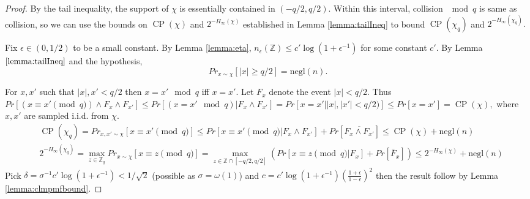 \documentclass[11pt]{article}
\newcommand{\negl}[1]{\text{negl}(#1)}
\newcommand{\Z}{\mathbb{Z}}
\newcommand{\abs}[1]{|#1 |}
\newtheorem{lemma}{Lemma}[section]
\DeclareMathOperator{\cp}{CP}
\begin{document}
\begin{proof}
By the tail inequality, the support of $\chi$ is essentially contained in $(-q/2, q/2).$ Within this interval, collision $\mod q$ is same as collision, so we can use the bounds on $\cp(\chi)$ and $2^{-H_{\infty}(\chi)} $ established in Lemma \ref{lemma:tailIneq} to bound $\cp(\chi_q)$ and $ 2^{-H_{\infty}(\chi_q)}.$

Fix $\epsilon\in (0,1/2)$ to be a small constant. By Lemma \ref{lemma:eta}, $n_{\epsilon}(\Z) \leq c' \log (1+ \epsilon^{-1})$ for some constant $c'.$ By Lemma $\ref{lemma:tailIneq}$ and the hypothesis, $$Pr_{x \sim \chi} [ \abs{x} \geq q/2] = \negl{n}.$$

For $x,x'$ such that $\abs{x},{x'} < q/2$ then $x = x' \mod q$ iff $x=x'.$ %
Let $F_x$ denote the event $\abs{x} < q/2.$ Thus $Pr [(x\equiv x' \pmod{q} ) \land F_x \land F_{x'}] \leq Pr [(x=x' \!\mod q ) | F_x \land F_{x'}] = Pr [x=x' | \abs{x},\abs{x'} < q/2) ] \leq Pr[x=x'] = \cp(\chi), $ where $x, x'$ are sampled i.i.d. from $\chi.$
\begin{align*}
    &\cp(\chi_q) = Pr_{x, x' \sim \chi} [x\equiv x'\pmod{q}] \leq  Pr [x\equiv x'\pmod{q}  | F_x \land F_{x'}] +  Pr[\overline{F_x \land F_{x'}}]  \leq \cp(\chi) + \negl{n}\\
    &2^{-H_{\infty}(\chi_q)}  = \max_{z \in \Z_q} Pr_{x \sim \chi} [x\equiv z \pmod{q}]=\max_{z\in \Z \cap [-q/2,q/2]} (Pr [x\equiv z \pmod{q} | F_x]+  Pr[\bar{F}_x] )\leq 2^{-H_{\infty}(\chi)} + \negl{n}
\end{align*}
 Pick $\delta = \sigma^{-1} c' \log (1+\epsilon^{-1}) < 1/\sqrt{2}$ (possible as $\sigma = \omega (1)$) and $c = c' \log (1+\epsilon^{-1}) (\frac{1 + \epsilon}{1-\epsilon})^2 $ then the result follow by Lemma \ref{lemma:clmpmfbound}.
\end{proof}
\end{document}
